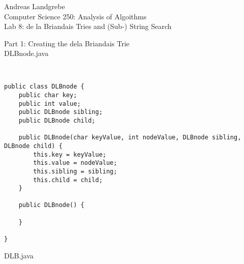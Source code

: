 \documentclass{article}
\begin{document}
\begin{center}
Andreas Landgrebe
\\
Computer Science 250: Analysis of Algoithms
\\
Lab 8: de la Briandais Tries and (Sub-) String Search
\\
\end{center}
\newpage
\begin{center}
Part 1: Creating the dela Briandais Trie
\\
DLBnode.java
\end{center}
\begin{lstlisting}


public class DLBnode {
	public char key;
	public int value;
	public DLBnode sibling;
	public DLBnode child;

	public DLBnode(char keyValue, int nodeValue, DLBnode sibling, DLBnode child) {
		this.key = keyValue;
		this.value = nodeValue;
		this.sibling = sibling;
		this.child = child;
	}

	public DLBnode() {
		
	}
	
}

\end{lstlisting}
DLB.java
\end{document}
